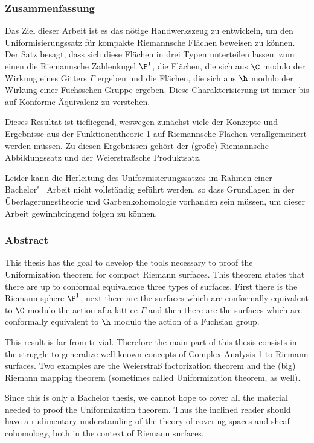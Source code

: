 
\subsubsection*{Zusammenfassung}
\label{sec:Zusammenfassung}

Das Ziel dieser Arbeit ist es das nötige Handwerkszeug zu
entwickeln, um den Uniformisierungssatz für kompakte Riemannsche
Flächen beweisen zu können. Der Satz besagt, dass sich diese
Flächen in drei Typen unterteilen lassen: zum einen die Riemannsche
Zahlenkugel $\P^1$, die Flächen, die sich aus $\C$ modulo der
Wirkung eines Gitters $\Gamma$ ergeben und die Flächen, die sich aus
$\h$ modulo der Wirkung einer Fuchsschen Gruppe
ergeben. Diese Charakterisierung ist immer bis auf Konforme
Äquivalenz zu verstehen.

Dieses Resultat ist tiefliegend, weswegen zunächst viele der
Konzepte und Ergebnisse aus der Funktionentheorie 1 auf
Riemannsche Flächen verallgemeinert werden müssen. Zu diesen
Ergebnissen gehört der (große) Riemannsche Abbildungssatz und der
Weierstraßsche Produktsatz.

Leider kann die Herleitung des Uniformisierungssatzes im Rahmen
einer Bachelor"=Arbeit nicht vollständig geführt werden, so dass
Grundlagen in der Überlagerungstheorie und Garbenkohomologie
vorhanden sein müssen, um dieser Arbeit gewinnbringend folgen zu können.

\subsubsection*{Abstract}
\label{sec:abstract}

This thesis has the goal to develop the tools necessary to proof the
Uniformization theorem for compact Riemann surfaces. This theorem
states that there are up to conformal equivalence three types of
surfaces. First there is the Riemann sphere $\P^1$, next there are the
surfaces which are conformally equivalent to $\C$ modulo the action
af a lattice $\Gamma$ and then there are the surfaces which are
conformally equivalent to $\h$ modulo the action of a Fuchsian group.


This result is far from trivial. Therefore the main part of this
thesis consists in the struggle to generalize well-known concepts of
Complex Analysis 1 to Riemann surfaces. Two examples are the
Weierstraß factorization theorem and the (big) Riemann mapping theorem
(sometimes called Uniformization theorem, as well).

Since this is only a Bachelor thesis, we cannot hope to cover all the
material needed to proof the Uniformization theorem. Thus the inclined
reader should have a rudimentary understanding of the theory of
covering spaces and sheaf cohomology, both in the context of Riemann surfaces.


